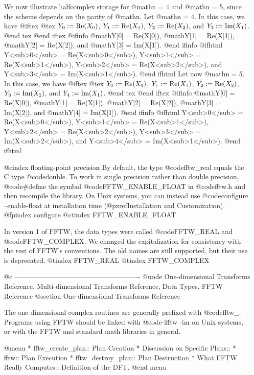 We now illustrate halfcomplex storage for @math{n = 4} and @math{n = 5},
since the scheme depends on the parity of @math{n}.  Let @math{n = 4}.
In this case, we have
@iftex
@tex
$Y_0 := \hbox{Re}(X_0)$, $Y_1 := \hbox{Re}(X_1)$,
$Y_2 := \hbox{Re}(X_2)$, and $Y_3 := \hbox{Im}(X_1)$.
@end tex
@end iftex
@ifinfo
@math{Y[0] = Re(X[0])}, @math{Y[1] = Re(X[1])},
@math{Y[2] = Re(X[2])}, and  @math{Y[3] = Im(X[1])}.
@end ifinfo
@ifhtml
Y<sub>0</sub> = Re(X<sub>0</sub>), Y<sub>1</sub> = Re(X<sub>1</sub>),
Y<sub>2</sub> = Re(X<sub>2</sub>), and  Y<sub>3</sub> = Im(X<sub>1</sub>).
@end ifhtml
Let now @math{n = 5}.  In this case, we have
@iftex
@tex
$Y_0 := \hbox{Re}(X_0)$, $Y_1 := \hbox{Re}(X_1)$,
$Y_2 := \hbox{Re}(X_2)$, $Y_3 := \hbox{Im}(X_2)$, and 
$Y_4 := \hbox{Im}(X_1)$.
@end tex
@end iftex
@ifinfo
@math{Y[0] = Re(X[0])}, @math{Y[1] = Re(X[1])},
@math{Y[2] = Re(X[2])}, @math{Y[3] = Im(X[2])}, and
@math{Y[4] = Im(X[1])}.
@end ifinfo
@ifhtml
Y<sub>0</sub> = Re(X<sub>0</sub>), Y<sub>1</sub> = Re(X<sub>1</sub>),
Y<sub>2</sub> = Re(X<sub>2</sub>), Y<sub>3</sub> = Im(X<sub>2</sub>),
and Y<sub>4</sub> = Im(X<sub>1</sub>).
@end ifhtml

@cindex floating-point precision
By default, the type @code{fftw_real} equals the C type @code{double}.
To work in single precision rather than double precision, @code{#define}
the symbol @code{FFTW_ENABLE_FLOAT} in @code{fftw.h} and then recompile
the library.  On Unix systems, you can instead use @code{configure
--enable-float} at installation time (@pxref{Installation and
Customization}).
@fpindex configure
@ctindex FFTW_ENABLE_FLOAT

In version 1 of FFTW, the data types were called @code{FFTW_REAL} and
@code{FFTW_COMPLEX}.  We changed the capitalization for consistency with
the rest of FFTW's conventions.  The old names are still supported, but
their use is deprecated.
@tindex FFTW_REAL
@tindex FFTW_COMPLEX

@c -------------------------------------------------------
@node One-dimensional Transforms Reference, Multi-dimensional Transforms Reference, Data Types, FFTW Reference
@section One-dimensional Transforms Reference

The one-dimensional complex routines are generally prefixed with
@code{fftw_}.  Programs using FFTW should be linked with @code{-lfftw
-lm} on Unix systems, or with the FFTW and standard math libraries in
general.

@menu
* fftw_create_plan::            Plan Creation
* Discussion on Specific Plans::  
* fftw::                        Plan Execution
* fftw_destroy_plan::           Plan Destruction
* What FFTW Really Computes::   Definition of the DFT.
@end menu

